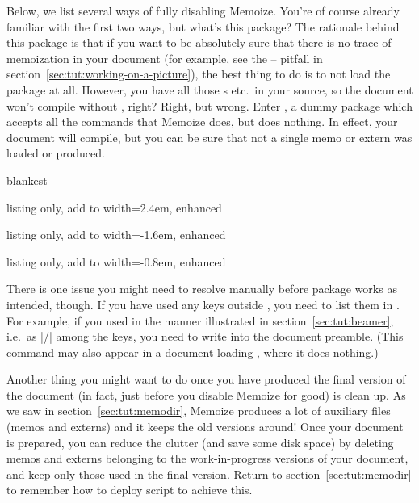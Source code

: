 \documentclass[a4paper,11pt]{article}
\begin{document}
Below, we list several ways of fully disabling Memoize.  You're of course
already familiar with the first two ways, but what's this 
package?  The rationale behind this package is that if you want to be
absolutely sure that there is no trace of memoization in your document (for
example, see the  --  pitfall in
section~\ref{sec:tut:working-on-a-picture}), the best thing to do is to not
load the package at all.  However, you have all those s etc.\ in
your source, so the document won't compile without
, right?  Right, but wrong.  Enter
, a dummy package which accepts all the commands that
Memoize does, but does nothing.  In effect, your document will compile, but you
can be sure that not a single memo or extern was loaded or produced.

\begin{tcboxedraster}[raster columns=3, raster force size=false, raster valign=top]{blankest}
  \begin{tcblisting}{listing only, add to width=2.4em, enhanced}
\usepackage[~disable~]{memoize}
  \end{tcblisting}
  \begin{tcblisting}{listing only, add to width=-1.6em, enhanced}
\usepackage{memoize}
  \end{tcblisting}
  \begin{tcblisting}{listing only, add to width=-0.8em, enhanced}
\usepackage{~no~memoize}
  \end{tcblisting}
\end{tcboxedraster}

There is one issue you might need to resolve manually before package
 works as intended, though.  If you have used any
 keys outside , you need to list them in
.  For example, if you used  in the
manner illustrated in section~\ref{sec:tut:beamer}, i.e.\ as
|/| among the \TikZ keys, you need to
write  into the document
preamble.  (This command may also appear in a document loading ,
where it does nothing.)

Another thing you might want to do once you have produced the final version of
the document (in fact, just before you disable Memoize for good) is clean up.
As we saw in section~\ref{sec:tut:memodir}, Memoize produces a lot of auxiliary
files (memos and externs) and it keeps the old versions around!  Once your
document is prepared, you can reduce the clutter (and save some disk space) by
deleting memos and externs belonging to the work-in-progress versions of your
document, and keep only those used in the final version.  Return to
section~\ref{sec:tut:memodir} to remember how to deploy script
 to achieve this.
\end{document}
